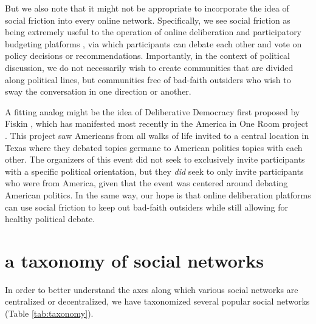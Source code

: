 \documentclass[sigconf,authordraft]{acmart}
\begin{document}
But we also note that it might not be appropriate to incorporate the idea of social friction into every online network. Specifically, we see social friction as being extremely useful to the operation of online deliberation \cite{semaan2015designing} and participatory budgeting platforms \cite{de1998participatory,shah2007participatory,wampler2010participatory,cabannes2004participatory}, via which participants can debate each other and vote on policy decisions or recommendations. Importantly, in the context of political discussion, we do not necessarily wish to create communities that are divided along political lines, but communities free of bad-faith outsiders who wish to sway the conversation in one direction or another. 

A fitting analog might be the idea of Deliberative Democracy first proposed by Fiskin \cite{fishkin1991democracy}, which has manifested most recently in the America in One Room project \cite{AmericaInOneRoom}. This project saw Americans from all walks of life invited to a central location in Texas where they debated topics germane to American politics topics with each other. The organizers of this event did not seek to exclusively invite participants with a specific political orientation, but they {\itshape did} seek to only invite participants who were from America, given that the event was centered around debating American politics. In the same way, our hope is that online deliberation platforms can use social friction to keep out bad-faith outsiders while still allowing for healthy political debate.

\section{a taxonomy of social networks}

In order to better understand the axes along which various social networks are centralized or decentralized, we have taxonomized several popular social networks  (Table \ref{tab:taxonomy}).

\end{document}

